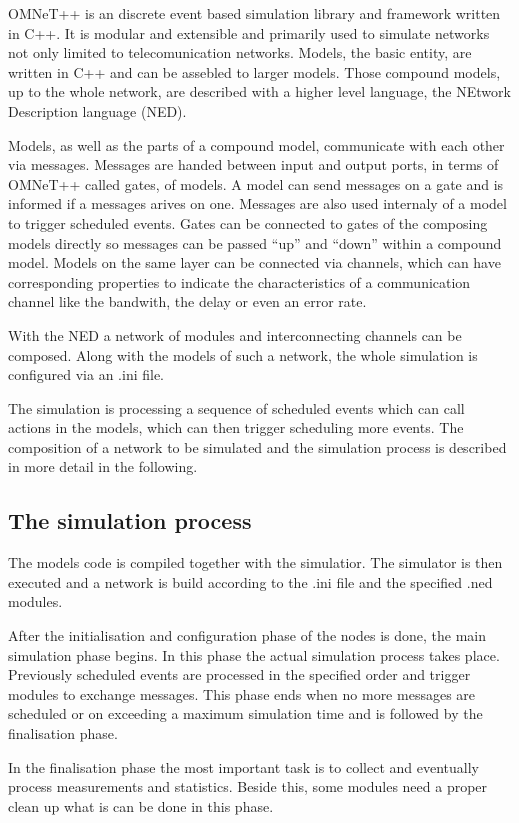 OMNeT++ is an discrete event based simulation library and framework written in C++. It is modular and extensible and primarily used to simulate networks not only limited to telecomunication networks. Models, the basic entity, are written in C++ and can be assebled to larger models. Those compound models, up to the whole network, are described with a higher level language, the NEtwork Description language (NED). 

Models, as well as the parts of a compound model, communicate with each other via messages. Messages are handed between input and output ports, in terms of OMNeT++ called gates, of models. A model can send messages on a gate and is informed if a messages arives on one. Messages are also used internaly of a model to trigger scheduled events. Gates can be connected to gates of the composing models directly so messages can be passed ``up'' and ``down'' within a compound model. Models on the same layer can be connected via channels, which can have corresponding properties to indicate the characteristics of a communication channel like the bandwith, the delay or even an error rate.

With the NED a network of modules and interconnecting channels can be composed. Along with the models of such a network, the whole simulation is configured via an .ini file.

The simulation is processing a sequence of scheduled events which can call actions in the models, which can then trigger scheduling more events. The composition of a network to be simulated and the simulation process is described in more detail in the following.

\subsection{The simulation process}

The models code is compiled together with the simulatior. The simulator is then executed and a network is build according to the .ini file and the specified .ned modules.

After the initialisation and configuration phase of the nodes is done, the main simulation phase begins. In this phase the actual simulation process takes place. Previously scheduled events are processed in the specified order and trigger modules to exchange messages. This phase ends when no more messages are scheduled or on exceeding a maximum simulation time and is followed by the finalisation phase.

In the finalisation phase the most important task is to collect and eventually process measurements and statistics. Beside this, some modules need a proper clean up what is can be done in this phase.


